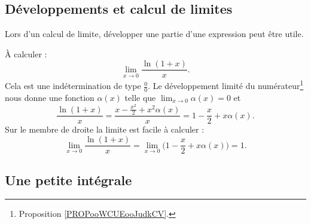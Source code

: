 \subsection{Développements et calcul de limites}

Lors d'un calcul de limite, développer une partie d'une expression peut être utile.

\begin{example}
	À calculer :
	\begin{equation}
		\lim_{x\to 0} \frac{ \ln(1+x) }{ x }.
	\end{equation}
	Cela est une indétermination de type \( \frac{ 0 }{ 0 }\). Le développement limité du numérateur\footnote{Proposition \ref{PROPooWCUEooJudkCV}.} nous donne une fonction \( \alpha(x)\) telle que \( \lim_{x\to 0} \alpha(x)=0\) et
	\begin{equation}
		\frac{ \ln(1+x) }{ x }=\frac{ x-\frac{ x^2 }{2}+x^2\alpha(x) }{ x }=1-\frac{ x }{ 2 }+x\alpha(x).
	\end{equation}
	Sur le membre de droite la limite est facile à calculer :
	\begin{equation}
		\lim_{x\to 0} \frac{ \ln(1+x) }{ x }=\lim_{x\to 0} \Big( 1-\frac{ x }{ 2 }+x\alpha(x) \Big) =1.
	\end{equation}
\end{example}

\subsection{Une petite intégrale}

